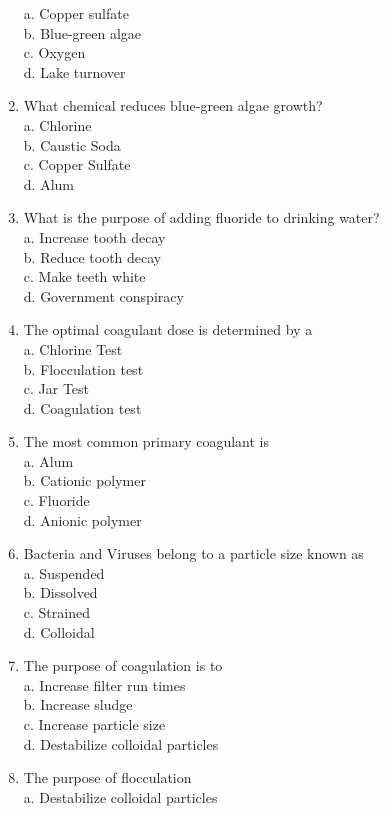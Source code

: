 \begin{enumerate}
a. Copper sulfate\\
b. Blue-green algae\\
c. Oxygen\\
d. Lake turnover\\
\item What chemical reduces blue-green algae growth?\\
a. Chlorine\\
b. Caustic Soda\\
c. Copper Sulfate\\
d. Alum\\
\item What is the purpose of adding fluoride to drinking water?\\
a. Increase tooth decay\\
b. Reduce tooth decay\\
c. Make teeth white\\
d. Government conspiracy\\
\item The optimal coagulant dose is determined by a\\
a. Chlorine Test\\
b. Flocculation test\\
c. Jar Test\\
d. Coagulation test\\
\item The most common primary coagulant is\\
a. Alum\\
b. Cationic polymer\\
c. Fluoride\\
d. Anionic polymer\\
\item Bacteria and Viruses belong to a particle size known as\\
a. Suspended\\
b. Dissolved\\
c. Strained\\
d. Colloidal\\
\item The purpose of coagulation is to\\
a. Increase filter run times\\
b. Increase sludge\\
c. Increase particle size\\
d. Destabilize colloidal particles\\
\item The purpose of flocculation\\
a. Destabilize colloidal particles\\

\end{enumerate}
